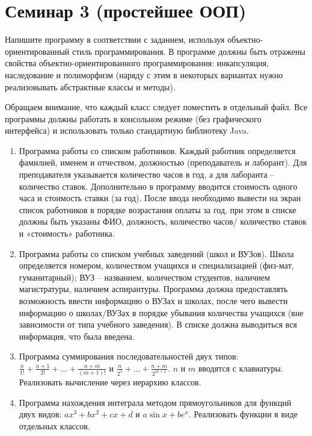 \documentclass[12pt]{article}
\begin{document}
\section{Семинар 3 (простейшее ООП)}

Напишите программу в соответствии с заданием, 
используя объектно-ориентированный стиль программирования. 
В программе должны быть отражены свойства объектно-ориентированного 
программирования: 
инкапсуляция, наследование и полиморфизм (наряду с этим в некоторых
вариантах нужно реализовывать абстрактные классы и методы). 

Обращаем внимание, что каждый класс следует поместить в отдельный файл.
Все программы должны работать в консольном режиме (без графического интерфейса) 
и использовать только стандартную библиотеку Java.

\begin{enumerate}
\item Программа работы со списком работников. Каждый работник определяется фамилией, именем и отчеством, должностью 
(преподаватель и лаборант). Для преподавателя указывается количество часов в год, а для лаборанта -- количество ставок.
Дополнительно в программу вводится стоимость одного часа и стоимость ставки (за год). После ввода необходимо вывести на экран
список работников в порядке возрастания оплаты за год, при этом в списке должны быть указаны ФИО, должность, количество часов/
количество ставок и «стоимость» работника.

\item Программа работы со списком учебных заведений (школ и ВУЗов). Школа определяется номером, количеством
учащихся и специализацией (физ-мат, гуманитарный); ВУЗ -- названием, количеством студентов, наличием магистратуры, наличием
аспирантуры. Программа должна предоставлять возможность ввести информацию о ВУЗах и школах, после чего
вывести информацию о школах/ВУЗах в порядке убывания количества учащихся (вне зависимости от типа учебного заведения).
В списке должна выводиться вся информация, что была введена.

\item Программа суммирования последовательностей двух типов: $\frac{n}{1!}+\frac{n+1}{2!}+\dots+\frac{n+m}{(m+1)!}$ и
$\frac{n}{2^1}+\dots+\frac{n+m}{2^{m+1}}$. $n$ и $m$ вводятся с клавиатуры. Реализовать вычисление через иерархию классов.

\item Программа нахождения интеграла методом прямоугольников для функций двух видов: $ax^3+bx^2+cx+d$ и $a\sin x+ be^x$.
Реализовать функции в виде отдельных классов.


\end{enumerate}
\end{document}
